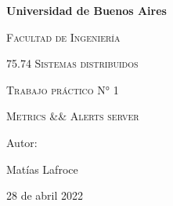 \documentclass[12pt, a4paper]{article}
\begin{document}
\begin{titlepage}
	\centering
	\vspace{1cm}
	{\bfseries\LARGE Universidad de Buenos Aires \par}
	{\scshape\Large Facultad de Ingeniería\par}
	\vspace{3cm}
	{\scshape\Large 75.74 Sistemas distribuidos\par}
	\vspace{3cm}
	{\scshape\Huge Trabajo práctico N° 1 \par}
	{\scshape\Huge Metrics \&\& Alerts server \par}
	\vfill
	{\Large Autor: \par}
	{\Large Matías Lafroce \par}
	\vfill
	{\Large 28 de abril 2022 \par}
\end{titlepage}

\tableofcontents


\end{document}
